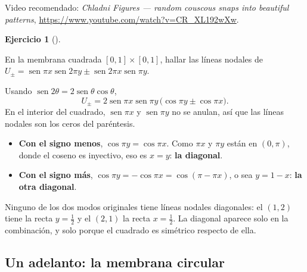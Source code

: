 \documentclass[
  spanish,
  a4paper,
]{scrbook}
\providecommand{\tightlist}{%
  \setlength{\itemsep}{0pt}\setlength{\parskip}{0pt}}
\theoremstyle{definition}
\theoremstyle{plain}
\theoremstyle{definition}
\theoremstyle{plain}
\theoremstyle{definition}
\newtheorem{exercise}{Ejercicio}[chapter]
\theoremstyle{remark}
\begin{document}
Video recomendado: \emph{Chladni Figures --- random couscous snaps into
beautiful patterns}, \url{https://www.youtube.com/watch?v=CR_XL192wXw}.

\begin{exercise}[]\protect\hypertarget{exr-hip-diagonal}{}\label{exr-hip-diagonal}

En la membrana cuadrada \([0,1]\times[0,1]\), hallar las líneas nodales
de
\(U_\pm = \operatorname{sen}\pi x\operatorname{sen}2\pi y \pm \operatorname{sen}2\pi x\operatorname{sen}\pi y\).

\end{exercise}

\begin{tcolorbox}[enhanced jigsaw, arc=.35mm, bottomrule=.15mm, bottomtitle=1mm, breakable, colback=white, colbacktitle=quarto-callout-tip-color!10!white, colframe=quarto-callout-tip-color-frame, coltitle=black, left=2mm, leftrule=.75mm, opacityback=0, opacitybacktitle=0.6, rightrule=.15mm, title=\textcolor{quarto-callout-tip-color}{\faLightbulb}\hspace{0.5em}{Solución}, titlerule=0mm, toprule=.15mm, toptitle=1mm]

Usando
\(\operatorname{sen}2\theta = 2\operatorname{sen}\theta\cos\theta\), \[
U_\pm = 2\operatorname{sen}\pi x\operatorname{sen}\pi y\,\big(\cos\pi y \pm \cos\pi x\big).
\] En el interior del cuadrado, \(\operatorname{sen}\pi x\) y
\(\operatorname{sen}\pi y\) no se anulan, así que las líneas nodales son
los ceros del paréntesis.

\begin{itemize}
\tightlist
\item
  \textbf{Con el signo menos}, \(\cos\pi y = \cos\pi x\). Como \(\pi x\)
  y \(\pi y\) están en \((0,\pi)\), donde el coseno es inyectivo, eso es
  \(x = y\): \textbf{la diagonal}.
\item
  \textbf{Con el signo más},
  \(\cos\pi y = -\cos\pi x = \cos(\pi - \pi x)\), o sea \(y = 1 - x\):
  \textbf{la otra diagonal}.
\end{itemize}

Ninguno de los dos modos originales tiene líneas nodales diagonales: el
\((1,2)\) tiene la recta \(y = \tfrac12\) y el \((2,1)\) la recta
\(x=\tfrac12\). La diagonal aparece solo en la combinación, y solo
porque el cuadrado es simétrico respecto de ella.

\end{tcolorbox}

\subsection{Un adelanto: la membrana circular}\label{sec-hip-circular}
\end{document}
